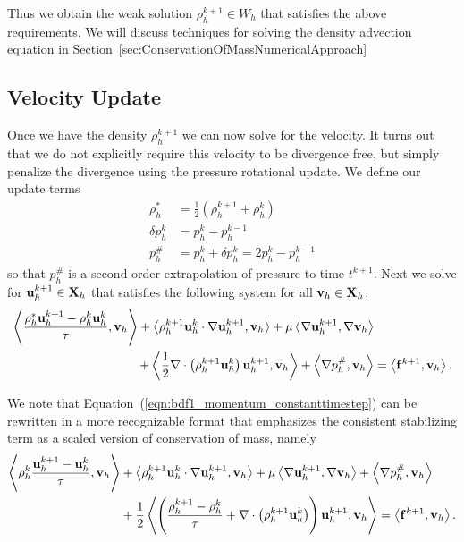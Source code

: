 \documentclass[letterpaper]{erdc}
\begin{document}
Thus we obtain the weak solution $\rho_h^{k+1}\in W_h$ that satisfies the above requirements.  We will discuss techniques for solving the density advection equation in Section~\ref{sec:ConservationOfMassNumericalApproach}

%
%
\subsection{Velocity Update}
Once we have the density $\rho_h^{k+1}$ we can now solve for the velocity.  It turns out that we do not explicitly require this velocity to be divergence free, but simply penalize the divergence using the pressure rotational update.  We define our update terms
\begin{align*}
  \rho_h^{*} &= \frac{1}{2}\left( \rho_h^{k+1} + \rho_h^{k} \right)\\
  \delta p_h^{k} &= p_h^{k} - p_h^{k-1}\\
    p_h^{\#} &= p_h^{k} + \delta p_h^{k} = 2p_h^{k} - p_h^{k-1}
\end{align*}
so that $p_h^{\#}$ is a second order extrapolation of pressure to time $t^{k+1}$.  Next we  solve for $\textbf{u}_h^{k+1}\in\textbf{X}_h$ that satisfies the following system for all $\textbf{v}_h\in\textbf{X}_h$,
\begin{equation}\label{eqn:bdf1_momentum_constanttimestep}
  \begin{split}
\left\langle  \frac{\rho_h^{*}\textbf{u}_h^{k+1}-\rho_h^{k}\textbf{u}_h^{k} }{\tau} , \textbf{v}_h \right\rangle + \left\langle  \rho_h^{k+1}\textbf{u}_h^{k}\cdot\nabla\textbf{u}_h^{k+1} , \textbf{v}_h \right\rangle+ \mu\left\langle  \nabla \textbf{u}_h^{k+1} , \nabla\textbf{v}_h \right\rangle&\\
 + \left\langle  \frac{1}{2}\nabla\cdot\left(\rho_h^{k+1}\textbf{u}_h^{k}\right)\textbf{u}_h^{k+1} , \textbf{v}_h \right\rangle +\left\langle \nabla p_h^{\#}, \textbf{v}_h \right\rangle &= \left\langle \mathbf{f}^{k+1}, \textbf{v}_h \right\rangle.
\end{split}
\end{equation}

We note that Equation~(\ref{eqn:bdf1_momentum_constanttimestep}) can be rewritten in a more recognizable format that emphasizes the consistent stabilizing term as a scaled version of conservation of mass, namely
\begin{equation}\label{eqn:bdf1morerecognizableform}
  \begin{split}
\left\langle \rho_h^{k} \frac{\textbf{u}_h^{k+1}-\textbf{u}_h^{k} }{\tau} , \textbf{v}_h \right\rangle &+ \left\langle  \rho_h^{k+1}\textbf{u}_h^{k}\cdot\nabla\textbf{u}_h^{k+1} , \textbf{v}_h \right\rangle + \mu\left\langle  \nabla \textbf{u}_h^{k+1} , \nabla\textbf{v}_h \right\rangle+\left\langle \nabla p_h^{\#}, \textbf{v}_h \right\rangle\\
 &+ \frac{1}{2}\left\langle  \left(\frac{\rho_h^{k+1} - \rho_h^{k}}{\tau} + \nabla\cdot\left(\rho_h^{k+1}\textbf{u}_h^{k}\right)  \right)\textbf{u}_h^{k+1} , \textbf{v}_h \right\rangle = \left\langle \mathbf{f}^{k+1}, \textbf{v}_h \right\rangle.
\end{split}
\end{equation}
\end{document}

